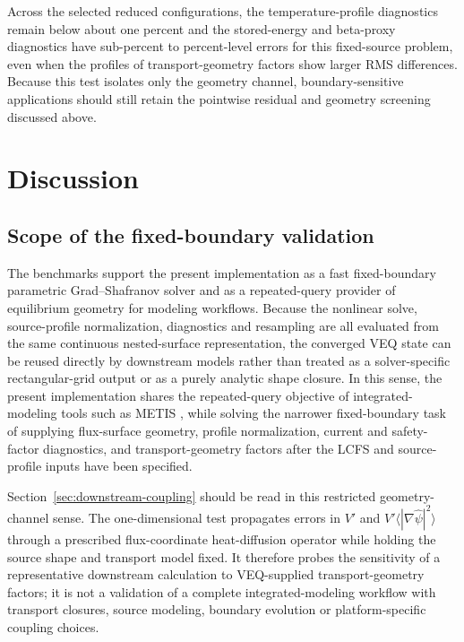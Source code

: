 \documentclass[final, 3p, times]{elsarticle}
\begin{document}
Across the selected reduced configurations, the temperature-profile diagnostics remain below about one percent and the stored-energy and beta-proxy diagnostics have sub-percent to percent-level errors for this fixed-source problem, even when the profiles of transport-geometry factors show larger RMS differences. Because this test isolates only the geometry channel, boundary-sensitive applications should still retain the pointwise residual and geometry screening discussed above.

\section{Discussion}
\label{sec:discussion}

\subsection{Scope of the fixed-boundary validation}

The benchmarks support the present implementation as a fast fixed-boundary parametric Grad--Shafranov solver and as a repeated-query provider of equilibrium geometry for modeling workflows. Because the nonlinear solve, source-profile normalization, diagnostics and resampling are all evaluated from the same continuous nested-surface representation, the converged VEQ state can be reused directly by downstream models rather than treated as a solver-specific rectangular-grid output or as a purely analytic shape closure. In this sense, the present implementation shares the repeated-query objective of integrated-modeling tools such as METIS \cite{Artaud2018}, while solving the narrower fixed-boundary task of supplying flux-surface geometry, profile normalization, current and safety-factor diagnostics, and transport-geometry factors after the LCFS and source-profile inputs have been specified.

Section~\ref{sec:downstream-coupling} should be read in this restricted geometry-channel sense. The one-dimensional test propagates errors in $V'$ and $V'\langle|\nabla\hat{\psi}|^2\rangle$ through a prescribed flux-coordinate heat-diffusion operator while holding the source shape and transport model fixed. It therefore probes the sensitivity of a representative downstream calculation to VEQ-supplied transport-geometry factors; it is not a validation of a complete integrated-modeling workflow with transport closures, source modeling, boundary evolution or platform-specific coupling choices.
\end{document}
